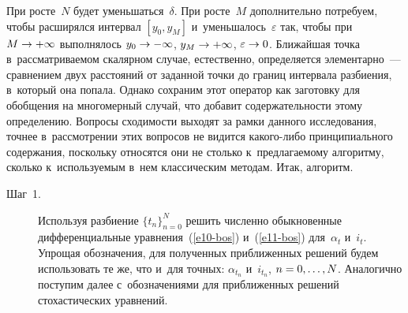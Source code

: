 \begin{multicols}{2}
     При росте~$N$ будет уменьшаться~$\delta$. При росте~$M$ 
дополнительно потребуем, чтобы расширялся интервал $[y_0, y_M]$ 
и~уменьшалось~$\varepsilon$ так, чтобы при $M\hm\to +\infty$ выполнялось 
$y_0\hm\to -\infty$, $y_M\hm\to +\infty$, $\varepsilon\hm\to 0$. Ближайшая 
точка в~рассматриваемом скалярном случае, естественно, определяется 
элементарно~--- сравнением двух расстояний от заданной точки до границ 
интервала разбиения, в~который она попала. Однако сохраним этот оператор 
как заготовку для обобщения на многомерный случай, что добавит 
содержательности этому определению. Вопросы сходимости выходят за 
рамки данного исследования, точнее в~рассмотрении этих вопросов не 
видится какого-либо принципиального содержания, поскольку относятся они 
не столько к~предлагаемому алгоритму, сколько к~используемым в~нем 
классическим методам. Итак, алгоритм.
     \begin{description}
\item[Шаг~1.] Используя разбиение $\{t_n\}^N_{n=0}$ решить численно 
обыкновенные дифференциальные уравнения~(\ref{e10-bos}) и~(\ref{e11-bos})
для~$\alpha_t$ и~$i_t$. Упрощая обозначения, для полученных 
приближенных решений будем использовать те же, что и~для точных: 
$\alpha_{t_n}$ и~$i_{t_n}$, $n\hm=0,\ldots , N$. Аналогично поступим далее 
с~обозначениями для приближенных решений стохастических уравнений.
     

\end{description}
\end{multicols}
